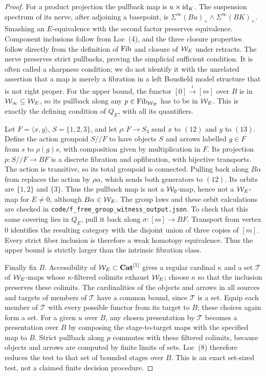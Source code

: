 \begin{proof}
For a product projection the pullback map is $u\times\mathrm{id}_K$.
The suspension spectrum of its nerve, after adjoining a basepoint,
is $\Sigma^\infty(Bu)_+\wedge\Sigma^\infty(BK)_+$. Smashing an
$E$-equivalence with the second factor preserves equivalence.
Component inclusions follow from Loc~(4), and the three closure
properties follow directly from the definition of $\operatorname{Fib}$ and
closure of $\mathcal{W}_E$ under retracts. The nerve preserves strict
pullbacks, proving the simplicial sufficient condition. It is
often called a sharpness condition; we do not identify it with
the unrelated assertion that a map is merely a fibration in a
left Bousfield model structure that is not right proper.
For the upper bound, the functor $[0]\xrightarrow{i}[m]$
over $B$ is in $\mathcal{W}_{\infty}\subseteq\mathcal{W}_E$, so its pullback along
any $p\in\operatorname{Fib}_{\mathcal{W}_E}$ has to be in $\mathcal{W}_E$. This is exactly
the defining condition of $Q_E$, with all its quantifiers.

Let $F=\langle x,y\rangle$, $S=\{1,2,3\}$, and let
$\rho:F\to S_3$ send $x$ to $(12)$ and $y$ to $(13)$.
Define the action groupoid $S/\!/F$ to have objects $S$ and
arrows labelled $g\in F$ from $s$ to $\rho(g)s$, with composition
given by multiplication in $F$. Its projection
$p:S/\!/F\to BF$ is a discrete fibration and opfibration,
with bijective transports. The action is transitive, so its
total groupoid is connected. Pulling back along $B\alpha$ from
 replaces the action by $\rho\alpha$, which sends
both generators to $(12)$. Its orbits are $\{1,2\}$ and $\{3\}$.
Thus the pullback map is not a $\mathcal{W}_0$-map, hence not a $\mathcal{W}_E$-map
for $E\neq0$, although $B\alpha\in\mathcal{W}_E$. The group laws and
these orbit calculations are checked in
\texttt{code/f\_free\_group\_witness\_output.json}.
To check that this same covering lies in $Q_E$, pull it back
along $\sigma:[m]\to BF$. Transport from vertex $0$
identifies the resulting category with the disjoint union of
three copies of $[m]$. Every strict fiber inclusion is
therefore a weak homotopy equivalence. Thus the upper bound
is strictly larger than the intrinsic fibration class.

Finally fix $B$. Accessibility of $\mathcal{W}_E\subset\mathbf{Cat}^{[1]}$
gives a regular cardinal $\kappa$ and a set $\mathcal T$ of
$\mathcal{W}_E$-maps whose $\kappa$-filtered colimits exhaust $\mathcal{W}_E$;
choose $\kappa$ so that the inclusion preserves these colimits.
The cardinalities of the objects and arrows in all sources and
targets of members of $\mathcal T$ have a common bound, since
$\mathcal T$ is a set. Equip each member of $\mathcal T$ with
every possible functor from its target to $B$; these choices
again form a set. For a given $u$ over $B$, any chosen
presentation by $\mathcal T$ becomes a presentation over $B$
by composing the stage-to-target maps with the specified map
to $B$. Strict pullback along $p$ commutes with these filtered
colimits, because objects and arrows are computed by finite
limits of sets. Loc~(8) therefore reduces the test to that set
of bounded stages over $B$. This is an exact set-sized test,
not a claimed finite decision procedure.
\end{proof}

